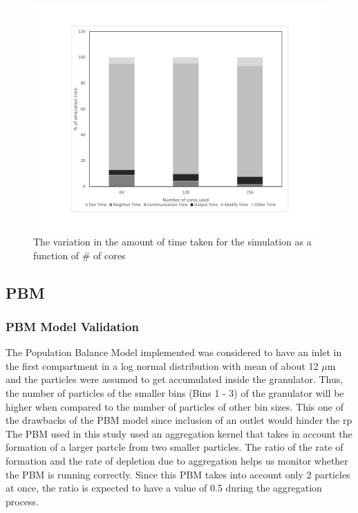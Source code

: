 \documentclass[preprint,11pt,authoryear]{elsarticle}
\begin{document}
\begin{figure}[H]
\centering
\includegraphics[scale=0.5]{rslts_DEM_percent_plot.pdf}
\caption{The variation in the amount of time taken for the simulation as a function of \# of cores}
\label{fig:rslts_DEM_percent_plot}
\end{figure}


\subsection{PBM}
\subsubsection{PBM Model Validation}
The Population Balance Model implemented was considered to have an inlet in the first compartment in a log normal distribution with mean of about 12 $\mu$m and the particles were assumed to get accumulated inside the granulator. Thus, the number of particles of the smaller bins (Bins 1 - 3) of the granulator will be higher when compared to the number of particles of other bin sizes. This one of the drawbacks of the PBM model since inclusion of an outlet would hinder the rp 
The PBM used in this study used an aggregation kernel that takes in account the formation of a larger partcle from two smaller particles. The ratio of the rate of formation and the rate of depletion due to aggregation helps us monitor whether the PBM is running correctly. Since this PBM takes into account only 2 particles at once, the ratio is expected to have a value of 0.5 during the aggregation process. 
\end{document}
